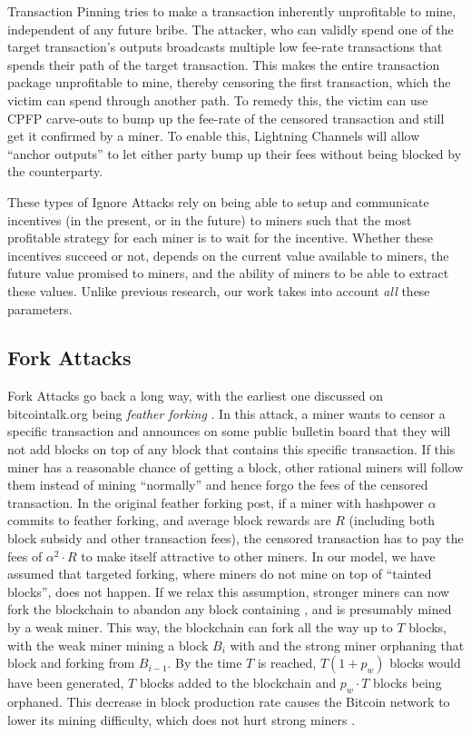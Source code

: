 Transaction Pinning \cite{transaction_pinning} tries to make a transaction inherently unprofitable to mine, independent of any future bribe. The attacker, who can validly spend one of the target transaction's outputs broadcasts multiple low fee-rate transactions that spends their path of the target transaction. This makes the entire transaction package unprofitable to mine, thereby censoring the first transaction, which the victim can spend through another path. To remedy this, the victim can use CPFP carve-outs \cite{cpfp_carveout} to bump up the fee-rate of the censored transaction and still get it confirmed by a miner. To enable this, Lightning Channels will allow ``anchor outputs'' \cite{anchor_outputs} to let either party bump up their fees without being blocked by the counterparty.

These types of Ignore Attacks rely on being able to setup and communicate incentives (in the present, or in the future) to miners such that the most profitable strategy for each miner is to wait for the incentive. Whether these incentives succeed or not, depends on the current value available to miners, the future value promised to miners, and the ability of miners to be able to extract these values. Unlike previous research, our work takes into account \textit{all} these parameters.

\subsection{Fork Attacks}
Fork Attacks go back a long way, with the earliest one discussed on bitcointalk.org being \emph{feather forking} \cite{feather_forking}. In this attack, a miner wants to censor a specific transaction and announces on some public bulletin board that they will not add blocks on top of any block that contains this specific transaction. If this miner has a reasonable chance of getting a block, other rational miners will follow them instead of mining ``normally'' and hence forgo the fees of the censored transaction. In the original feather forking post, if a miner with hashpower $\alpha$ commits to feather forking, and average block rewards are $R$ (including both block subsidy and other transaction fees), the censored transaction has to pay the fees of $\alpha^2 \cdot R$ to make itself attractive to other miners. In our model, we have assumed that targeted forking, where miners do not mine on top of ``tainted blocks'', does not happen. If we relax this assumption, stronger miners can now fork the blockchain to abandon any block containing \sellertxn{}, and is presumably mined by a weak miner. This way, the blockchain can fork all the way up to $T$ blocks, with the weak miner mining a block $B_i$ with \sellertxn{} and the strong miner orphaning that block and forking from $B_{i-1}$. By the time $T$ is reached, $T (1 + p_w)$ blocks would have been generated, $T$ blocks added to the blockchain and $p_w\cdot T$ blocks being orphaned. This decrease in block production rate causes the Bitcoin network to lower its mining difficulty, which does not hurt strong miners \cite{selfish_mining_rexamined}.

